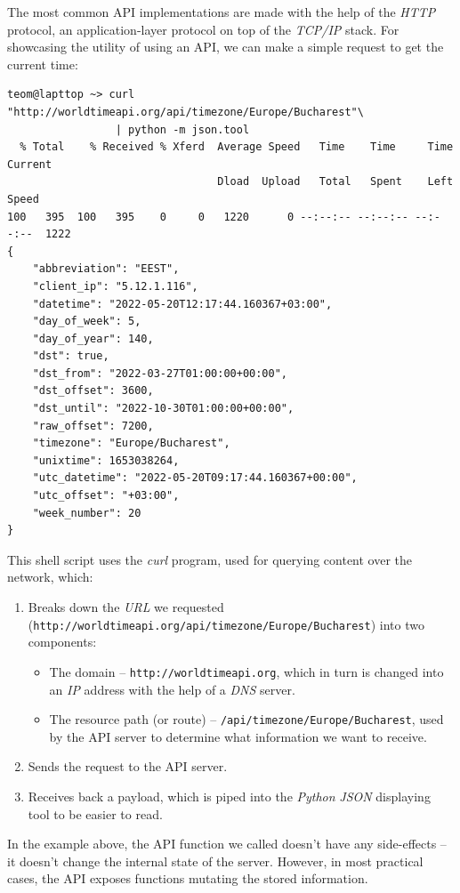 \documentclass[11pt, a4paper]{report}
\def\code#1{\texttt{#1}}
\begin{document}
The most common API implementations are made with the help of the \textit{HTTP} protocol, an application-layer protocol on top of the \textit{TCP/IP} stack. For showcasing the utility of using an API, we can make a simple request to get the current time:

\begin{verbatim}
teom@lapttop ~> curl "http://worldtimeapi.org/api/timezone/Europe/Bucharest"\
                 | python -m json.tool
  % Total    % Received % Xferd  Average Speed   Time    Time     Time  Current
                                 Dload  Upload   Total   Spent    Left  Speed
100   395  100   395    0     0   1220      0 --:--:-- --:--:-- --:--:--  1222
{
    "abbreviation": "EEST",
    "client_ip": "5.12.1.116",
    "datetime": "2022-05-20T12:17:44.160367+03:00",
    "day_of_week": 5,
    "day_of_year": 140,
    "dst": true,
    "dst_from": "2022-03-27T01:00:00+00:00",
    "dst_offset": 3600,
    "dst_until": "2022-10-30T01:00:00+00:00",
    "raw_offset": 7200,
    "timezone": "Europe/Bucharest",
    "unixtime": 1653038264,
    "utc_datetime": "2022-05-20T09:17:44.160367+00:00",
    "utc_offset": "+03:00",
    "week_number": 20
}
\end{verbatim}

This shell script uses the \textit{curl} program, used for querying content over the network, which:
\begin{enumerate}
    \item Breaks down the \textit{URL} we requested (\code{http://worldtimeapi.org/api/timezone/Europe/Bucharest}) into two components:
    \begin{itemize}
        \item The domain -- \code{http://worldtimeapi.org}, which in turn is changed into an \textit{IP} address with the help of a \textit{DNS} server.
        \item The resource path (or route) -- \code{/api/timezone/Europe/Bucharest}, used by the API server to determine what information we want to receive.
    \end{itemize}
    \item Sends the request to the API server.
    \item Receives back a payload, which is piped into the \textit{Python} \textit{JSON} displaying tool to be easier to read.
\end{enumerate}

In the example above, the API function we called doesn't have any side-effects -- it doesn't change the internal state of the server. However, in most practical cases, the API exposes functions mutating the stored information.
\end{document}
